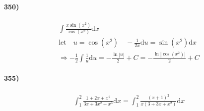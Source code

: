 \begin{multicols*}{2}
        \paragraph*{350)}
        \begin{equation*}
            \begin{gathered}
                \int\frac{x\sin(x^2)}{\cos(x^2)}\mathrm{d}x \\
                \text{let} \quad u = \cos(x^2) \quad -\frac{1}{2x}\mathrm{d}u = \sin(x^2)\mathrm{d}x    \\
                \Rightarrow -\frac{1}{2}\int\frac{1}{u}\mathrm{d}u = -\frac{\ln|u|}{2} + C = \boxed{-\frac{\ln|\cos(x^2)|}{2} + C}
            \end{gathered}
        \end{equation*}
        \horizontal

        \paragraph*{355)}
        \begin{equation*}
            \begin{gathered}
                \int_{1}^{2}\frac{1+2x+x^2}{3x+3x^2+x^3}\mathrm{d}x = \int_{1}^{2}\frac{(x+1)^2}{x(3+3x+x^2)}\mathrm{d}x
            \end{gathered}
        \end{equation*}
        \horizontal

    \end{multicols*}
